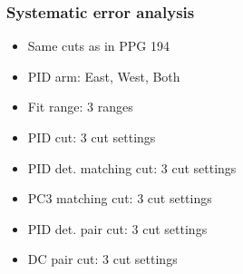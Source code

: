 \documentclass{beamer}
\begin{document}
\begin{frame}
\frametitle{Systematic error analysis}
\begin{itemize}
\setlength{\itemsep}{10pt}
\item Same cuts as in PPG 194
\item PID arm: East, West, Both
\item Fit range: 3 ranges
\item PID cut: 3 cut settings
\item PID det. matching cut: 3 cut settings
\item PC3 matching cut: 3 cut settings
\item PID det. pair cut: 3 cut settings
\item DC pair cut: 3 cut settings
\end{itemize}
\end{frame}
\end{document}
